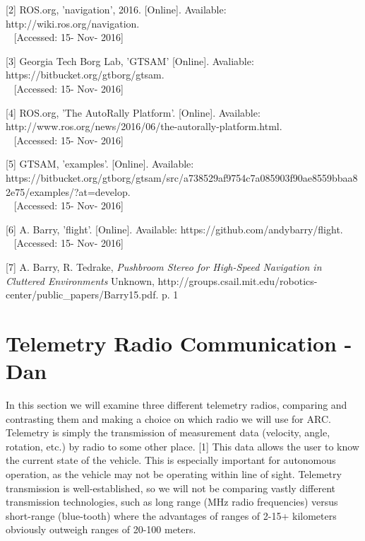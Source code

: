 \documentclass[compsoc,draftclsnofoot,onecolumn,10pt]{IEEEtran}
\begin{document}
[2] ROS.org, 'navigation', 2016. [Online]. Available: http://wiki.ros.org/navigation.\\~
[Accessed: 15- Nov- 2016]

[3] Georgia Tech Borg Lab, 'GTSAM' [Online]. Avaliable:
https://bitbucket.org/gtborg/gtsam.\\~
[Accessed: 15- Nov- 2016]

[4] ROS.org, 'The AutoRally Platform'. [Online]. Available: http://www.ros.org/news/2016/06/the-autorally-platform.html.\\~
[Accessed: 15- Nov- 2016]

[5] GTSAM, 'examples'. [Online]. Available:
https://bitbucket.org/gtborg/gtsam/src/a738529af9754c7a085903f90ae8559bbaa82e75/examples/?at=develop.\\~
[Accessed: 15- Nov- 2016]

[6] A. Barry, 'flight'. [Online]. Available:
https://github.com/andybarry/flight.\\~
[Accessed: 15- Nov- 2016]

[7] A. Barry, R. Tedrake, \textit{Pushbroom Stereo for High-Speed Navigation in
Cluttered Environments} Unknown,
http://groups.csail.mit.edu/robotics-center/public\_papers/Barry15.pdf. p. 1

\newpage

\section{Telemetry Radio Communication - Dan}
In this section we will examine three different telemetry radios, comparing and
contrasting them and making a choice on which radio we will use for ARC.
Telemetry is simply the transmission of measurement data (velocity, angle,
rotation, etc.) by radio to some other place. [1] This data allows the user to know the current state of the vehicle. This is especially
important for autonomous operation, as the vehicle may not be operating within
line of sight. Telemetry transmission is
well-established, so we will not be comparing vastly different transmission
technologies, such as long range (MHz radio frequencies) versus short-range
(blue-tooth) where the advantages of ranges of 2-15+ kilometers obviously
outweigh ranges of 20-100 meters.
\end{document}
